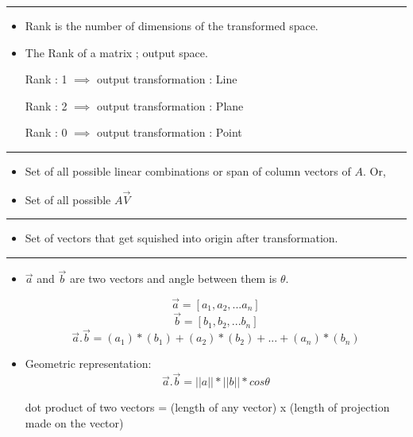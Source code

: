 \documentclass[	DIV=calc,%
paper=a4,%
fontsize=11pt,%
twocolumn]{scrartcl} %
\newcommand{\hformbar}[1]{\vspace{5pt}\hrule\vspace{10pt}} %
\newcommand{\formdesc}[1]{\noindent\textbf{#1}}
\begin{document}
\hformbar
\formdesc{Rank:}
\begin{itemize}
	\item Rank is the number of dimensions of the transformed space.
	\item The Rank of a matrix ; output space.
	
	Rank : 1 $\implies$ output transformation : Line
	
	Rank : 2 $\implies$ output transformation : Plane
	
	Rank : 0 $\implies$ output transformation : Point
\end{itemize}


\hformbar
\formdesc{Column space:}

\begin{itemize}
	\item Set of all possible linear combinations or span of column vectors of $A$. Or,
	\item Set of all possible $A \vec{V}$
\end{itemize}

\hformbar
\formdesc{Null space:}
\begin{itemize}
	\item Set of vectors that get squished into origin after transformation.
\end{itemize}

\hformbar
\formdesc{Dot Product:}
\begin{itemize}
	\item $\vec{a}$ and $\vec{b}$ are two vectors and angle between them is $\theta$.
	
	\begin{equation}
		\vec{a} = [a_1 ,a_2 ,... a_n]
	\end{equation}
	\begin{equation}
		\vec{b} = [b_1, b_2,... b_n]
	\end{equation}
	\begin{equation}
		\vec{a}.\vec{b} = (a_1)*(b_1) + (a_2)*(b_2) + ... + (a_n)*(b_n)
	\end{equation}
	
	\item Geometric representation:
	\begin{equation}
		\vec{a}.\vec{b} = ||{a}||* ||{b}||* cos \theta
	\end{equation}
	
	
	dot product of two vectors = (length of any vector) x 
	(length of projection made on the vector)
	
\end{itemize}
\end{document}
